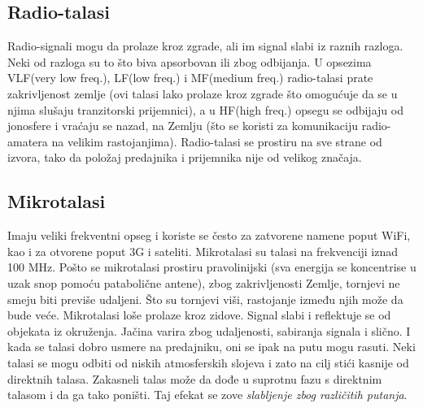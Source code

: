 \documentclass{article} %
\begin{document}
\subsection{Radio-talasi}
Radio-signali mogu da prolaze kroz zgrade, ali im signal slabi iz raznih razloga. Neki od razloga su to što biva apsorbovan ili zbog odbijanja. U opsezima VLF(very low freq.), LF(low freq.) i MF(medium freq.) radio-talasi prate zakrivljenost zemlje (ovi talasi lako prolaze kroz zgrade što omogućuje da se u njima slušaju tranzitorski prijemnici), a u HF(high freq.) opsegu se odbijaju od jonosfere i vraćaju se nazad, na Zemlju (što se koristi za komunikaciju radio-amatera na velikim rastojanjima). Radio-talasi se prostiru na sve strane od izvora, tako da položaj predajnika i prijemnika nije od velikog značaja.
\subsection{Mikrotalasi}
Imaju veliki frekventni opseg i koriste se često za zatvorene namene poput WiFi, kao i za otvorene poput 3G i sateliti. Mikrotalasi su talasi na frekvenciji iznad 100 MHz. Pošto se mikrotalasi prostiru pravolinijski (sva energija se koncentrise u uzak snop pomoću patabolične antene), zbog zakrivljenosti Zemlje, tornjevi ne smeju biti previše udaljeni. Što su tornjevi viši, rastojanje između njih može da bude veće. Mikrotalasi loše prolaze kroz zidove. Signal slabi i reflektuje se od objekata iz okruženja. Jačina varira zbog udaljenosti, sabiranja signala i slično. I kada se talasi dobro usmere na predajniku, oni se ipak na putu mogu rasuti. Neki talasi se mogu odbiti od niskih atmosferskih slojeva i zato na cilj stići kasnije od direktnih talasa. Zakasneli talas može da dođe u suprotnu fazu s direktnim talasom i da ga tako poništi. Taj efekat se zove \textit{slabljenje zbog različitih putanja}.
\end{document}
